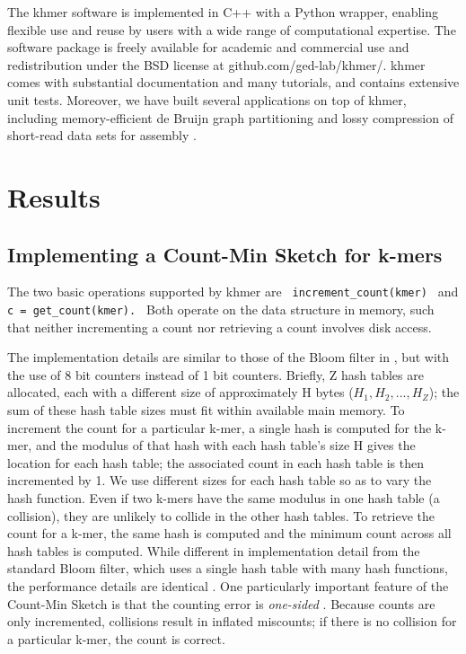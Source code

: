 \documentclass[10pt]{article}
\begin{document}
The khmer software \cite{khmer} is implemented in C++ with a Python
wrapper, enabling flexible use and reuse by users with a wide range of
computational expertise.  The software package is freely available for
academic and commercial use and redistribution under the BSD license
at github.com/ged-lab/khmer/.  khmer comes with substantial
documentation and many tutorials, and contains extensive unit tests.
Moreover, we have built several applications on top of khmer,
including memory-efficient de Bruijn graph partitioning
\cite{Pell2012} and lossy compression of short-read data sets for
assembly \cite{Brown2012}.

\section*{Results}

\subsection*{Implementing a Count-Min Sketch for k-mers}

The two basic operations supported by khmer are {\tt
  increment\_count(kmer) } and {\tt c = get\_count(kmer). } Both
operate on the data structure in memory, such that neither
incrementing a count nor retrieving a count involves disk access.

The implementation details are similar to those of the Bloom filter in
\cite{Pell2012}, but with the use of 8 bit counters instead of 1 bit
counters.  Briefly, Z hash tables are allocated, each with a different
size of approximately H bytes ($H_1, H_2, ..., H_Z$); the sum of these
hash table sizes must fit within available main memory.  To increment
the count for a particular k-mer, a single hash is computed for the
k-mer, and the modulus of that hash with each hash table's size H
gives the location for each hash table; the associated count in each
hash table is then incremented by 1.  We use different sizes for each
hash table so as to vary the hash function.  Even if two k-mers have
the same modulus in one hash table (a collision), they are unlikely to
collide in the other hash tables.  To retrieve the count for a k-mer,
the same hash is computed and the minimum count across all hash tables
is computed. While different in implementation detail from the
standard Bloom filter, which uses a single hash table with many
hash functions, the performance details are identical \cite{Pell2012}.
% 
One particularly important feature of the Count-Min Sketch is that the
counting error is {\em one-sided} \cite{Cormode2005}.  Because counts
are only incremented, collisions result in inflated miscounts; if
there is no collision for a particular k-mer, the count is correct.
\end{document}
